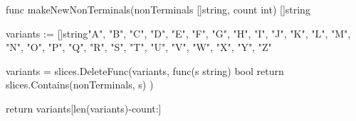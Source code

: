 func makeNewNonTerminals(nonTerminals []string, count int) []string {
	variants := []string{"A", "B", "C", "D", "E", "F", "G", "H", "I", "J", "K", "L", "M", "N", "O", "P", "Q", "R", "S", "T", "U", "V", "W", "X", "Y", "Z"}

	variants = slices.DeleteFunc(variants, func(s string) bool {
		return slices.Contains(nonTerminals, s)
	})

	return variants[len(variants)-count:]
}